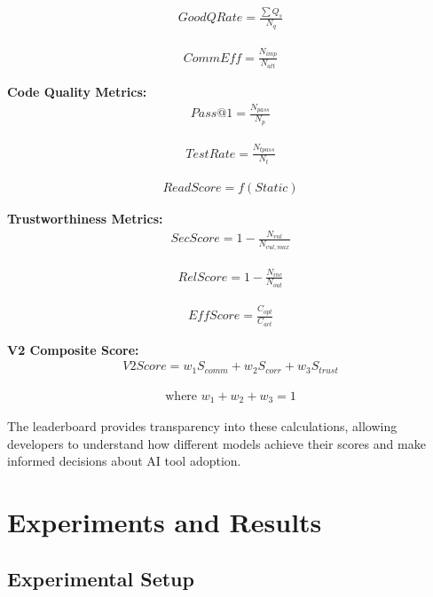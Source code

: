 \documentclass[conference]{IEEEtran}
\begin{document}
\begin{align}
    \mathit{GoodQRate} = \frac{\sum Q_{s}}{N_{q}}
\end{align}

\begin{align}
    \mathit{CommEff} = \frac{N_{imp}}{N_{att}}
\end{align}

\textbf{Code Quality Metrics:}
\begin{align}
    \mathit{Pass@1} = \frac{N_{pass}}{N_{p}}
\end{align}

\begin{align}
    \mathit{TestRate} = \frac{N_{tpass}}{N_{t}}
\end{align}

\begin{align}
    \mathit{ReadScore} = f(\mathit{Static})
\end{align}

\textbf{Trustworthiness Metrics:}
\begin{align}
    \mathit{SecScore} = 1 - \frac{N_{vul}}{N_{vul,max}}
\end{align}

\begin{align}
    \mathit{RelScore} = 1 - \frac{N_{inc}}{N_{out}}
\end{align}

\begin{align}
    \mathit{EffScore} = \frac{C_{opt}}{C_{act}}
\end{align}

\textbf{V2 Composite Score:}
\begin{align}
    \mathit{V2Score} = w_1 S_{comm} + w_2 S_{corr} + w_3 S_{trust}
\end{align}

\begin{align}
    \text{where } w_1 + w_2 + w_3 = 1
\end{align}

The leaderboard provides transparency into these calculations, allowing developers to understand how different models achieve their scores and make informed decisions about AI tool adoption.

\section{Experiments and Results}

\subsection{Experimental Setup}
\end{document}
